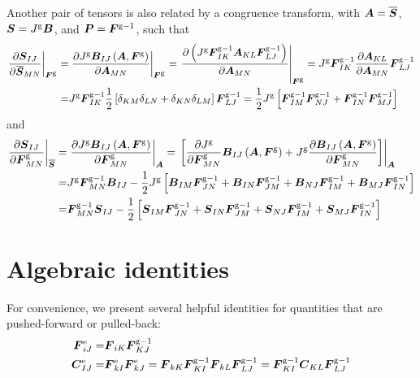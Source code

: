 \documentclass[10pt,letterpaper,oneside]{report}
\newcommand{\ten}[1]{\mbox{\boldmath $#1$}{}}
\newcommand{\scas}[1]{\mbox{{\scriptsize{${\rm{#1}}$}}}{}}
\newcommand{\tens}[1]{\mbox{\boldmath{\scriptsize{$#1$}}}{}}
\begin{document}
Another pair of tensors is also related by a congruence transform, with $\ten{A} = \overline{\ten{S}}$, $\ten{S} = J^{\scas{g}} \ten{B}$, and $\ten{P} = \ten{F}^{\scas{g}-1}$, such that 
\begin{align}
\left. \frac{\partial \ten{S}_{IJ}}{\partial \overline{\ten{S}}_{MN}} \right|_{\tens{F}^{\scas{g}}} 
=&
\left. \frac{\partial J^{\scas{g}} \ten{B}_{IJ} \left(\ten{A}, \ten{F}^{\scas{g}} \right)}{\partial \ten{A}_{MN}} \right|_{\tens{F}^{\scas{g}}} 
= \left. \frac{\partial \left( J^{\scas{g}} \ten{F}^{\scas{g}-1}_{IK} \ten{A}_{KL} \ten{F}^{\scas{g}-1}_{LJ} \right)}{\partial \ten{A}_{MN} } \right|_{\tens{F}^{\scas{g}}} 
= J^{\scas{g}} \ten{F}^{\scas{g}-1}_{IK} \frac{\partial \ten{A}_{KL} }{\partial \ten{A}_{MN} } \ten{F}^{\scas{g}-1}_{LJ} 
\notag \\
=& J^{\scas{g}} \ten{F}^{\scas{g}-1}_{IK} \frac{1}{2} \left[ \delta_{KM} \delta_{LN} + \delta_{KN} \delta_{LM} \right] \ten{F}^{\scas{g}-1}_{LJ} 
= \frac{1}{2} J^{\scas{g}} \left[ \ten{F}^{\scas{g}-1}_{IM} \ten{F}^{\scas{g}-1}_{NJ} + \ten{F}^{\scas{g}-1}_{IN} \ten{F}^{\scas{g}-1}_{MJ} \right] 
\label{dSdSbar}
\end{align}
and 
\begin{align}
\left. \frac{\partial \ten{S}_{IJ}}{\partial \ten{F}^{\scas{g}}_{MN}} \right|_{\overline{\tens{S}}}
=&
\left. \frac{\partial J^{\scas{g}} \ten{B}_{IJ} \left(\ten{A}, \ten{F}^{\scas{g}} \right)}{\partial \ten{F}^{\scas{g}}_{MN}} \right|_{\tens{A}} 
= \left. \left[ \frac{\partial J^{\scas{g}} }{\partial \ten{F}^{\scas{g}}_{MN}} \ten{B}_{IJ} \left(\ten{A}, \ten{F}^{\scas{g}} \right) + J^{\scas{g}} \frac{\partial \ten{B}_{IJ} \left(\ten{A}, \ten{F}^{\scas{g}} \right)}{\partial \ten{F}^{\scas{g}}_{MN}}\right] \right|_{\tens{A}} 
\notag \\ 
=& J^{\scas{g}} \ten{F}^{\scas{g}-1}_{MN} \ten{B}_{IJ} - \frac{1}{2} J^{\scas{g}} \left[ \ten{B}_{IM} \ten{F}^{\scas{g}-1}_{JN} + \ten{B}_{IN} \ten{F}^{\scas{g}-1}_{JM} + \ten{B}_{NJ} \ten{F}^{\scas{g}-1}_{IM} + \ten{B}_{MJ} \ten{F}^{\scas{g}-1}_{IN} \right]
\notag \\
=& \ten{F}^{\scas{g}-1}_{MN} \ten{S}_{IJ} - \frac{1}{2} \left[ \ten{S}_{IM} \ten{F}^{\scas{g}-1}_{JN} + \ten{S}_{IN} \ten{F}^{\scas{g}-1}_{JM} + \ten{S}_{NJ} \ten{F}^{\scas{g}-1}_{IM} + \ten{S}_{MJ} \ten{F}^{\scas{g}-1}_{IN} \right] 
\label{dSdFg}
\end{align}


\section{Algebraic identities}
For convenience, we present several helpful identities for quantities that are pushed-forward or pulled-back: 
\begin{align}
\ten{F}^{\scas{e}}_{iJ} =& \ten{F}_{iK} \ten{F}^{\scas{g}-1}_{KJ} 
\\
\ten{C}^{\scas{e}}_{IJ} =& \ten{F}^{\scas{e}}_{kI} \ten{F}^{\scas{e}}_{kJ} 
= \ten{F}_{kK} \ten{F}^{\scas{g}-1}_{KI} \ten{F}_{kL} \ten{F}^{\scas{g}-1}_{LJ} 
= \ten{F}^{\scas{g}-1}_{KI} \ten{C}_{KL} \ten{F}^{\scas{g}-1}_{LJ} 
\label{Ce}
\end{align}
\end{document}
